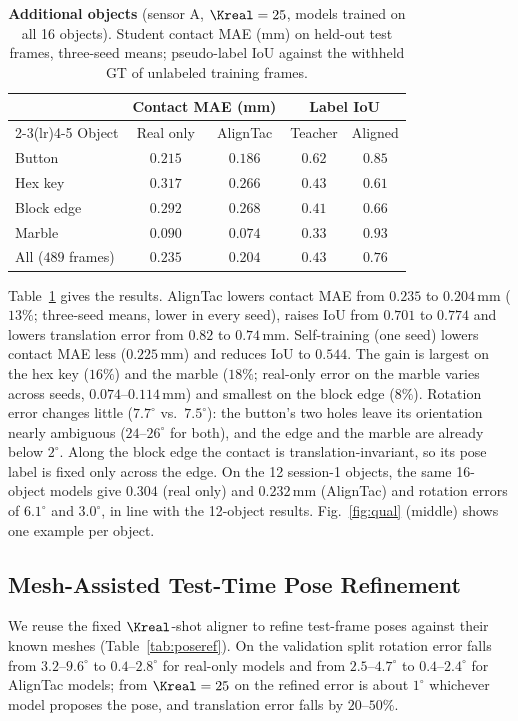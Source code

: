 \begin{table}[!tbp]
\centering
\tableformat
\begin{tabular}{lcccc}
\toprule
& \multicolumn{2}{c}{Contact MAE (mm)} & \multicolumn{2}{c}{Label IoU} \\
\cmidrule(lr){2-3}\cmidrule(lr){4-5}
Object & Real only & AlignTac & Teacher & Aligned \\
\midrule
Button & $0.215$ & $\mathbf{0.186}$ & $0.62$ & $\mathbf{0.85}$ \\
Hex key & $0.317$ & $\mathbf{0.266}$ & $0.43$ & $\mathbf{0.61}$ \\
Block edge & $0.292$ & $\mathbf{0.268}$ & $0.41$ & $\mathbf{0.66}$ \\
Marble & $0.090$ & $\mathbf{0.074}$ & $0.33$ & $\mathbf{0.93}$ \\
\midrule
All ($489$ frames) & $0.235$ & $\mathbf{0.204}$ & $0.43$ & $\mathbf{0.76}$ \\
\bottomrule
\end{tabular}
\caption{\textbf{Additional objects} (sensor A, $\Kreal=25$, models trained on all 16 objects). Student contact MAE (mm) on held-out test frames, three-seed means; pseudo-label IoU against the withheld GT of unlabeled training frames.}
\label{tab:addobj}
\end{table}

Table~\ref{tab:addobj} gives the results. AlignTac lowers contact MAE from $0.235$ to $0.204\,$mm ($13\%$; three-seed means, lower in every seed), raises IoU from $0.701$ to $0.774$ and lowers translation error from $0.82$ to $0.74\,$mm. Self-training (one seed) lowers contact MAE less ($0.225\,$mm) and reduces IoU to $0.544$. The gain is largest on the hex key ($16\%$) and the marble ($18\%$; real-only error on the marble varies across seeds, $0.074$--$0.114\,$mm) and smallest on the block edge ($8\%$). Rotation error changes little ($7.7^\circ$ vs.\ $7.5^\circ$): the button's two holes leave its orientation nearly ambiguous ($24$--$26^\circ$ for both), and the edge and the marble are already below $2^\circ$. Along the block edge the contact is translation-invariant, so its pose label is fixed only across the edge. On the 12 session-1 objects, the same 16-object models give $0.304$ (real only) and $0.232\,$mm (AlignTac) and rotation errors of $6.1^\circ$ and $3.0^\circ$, in line with the 12-object results. Fig.~\ref{fig:qual} (middle) shows one example per object.

\subsection{Mesh-Assisted Test-Time Pose Refinement}
\label{sec:tta}
We reuse the fixed $\Kreal$-shot aligner to refine test-frame poses against their known meshes (Table~\ref{tab:poseref}). On the validation split rotation error falls from $3.2$--$9.6^\circ$ to $0.4$--$2.8^\circ$ for real-only models and from $2.5$--$4.7^\circ$ to $0.4$--$2.4^\circ$ for AlignTac models; from $\Kreal=25$ on the refined error is about $1^\circ$ whichever model proposes the pose, and translation error falls by $20$--$50\%$.

